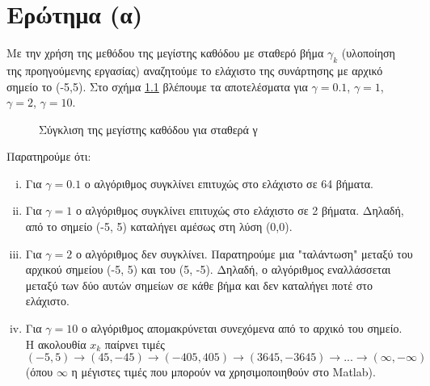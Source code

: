 \chapter{Ερώτημα (α)}

Με την χρήση της μεθόδου της μεγίστης καθόδου με σταθερό βήμα $\gamma_k$ (υλοποίηση της προηγούμενης εργασίας) 
αναζητούμε το ελάχιστο της συνάρτησης με αρχικό σημείο το (-5,5).
Στο σχήμα \ref{fig:stepeest_plots} βλέπουμε τα αποτελέσματα για $\gamma = 0.1$, $\gamma = 1$, $\gamma = 2$, $\gamma = 10$.

\begin{figure}[hbtp]
	\centering
	\setlength\figureheight{\textwidth}
	\setlength\figurewidth{\textwidth}
%	
	\caption{Σύγκλιση της μεγίστης καθόδου για σταθερά γ}
	\label{fig:stepeest_plots}
\end{figure}

\noindent \begin{minipage}{\linewidth}
\noindent Παρατηρούμε ότι:
\begin{enumerate}[i)]
	\item Για $\gamma = 0.1$ ο αλγόριθμος συγκλίνει επιτυχώς στο ελάχιστο σε 64 βήματα.
	\item Για $\gamma = 1$ ο αλγόριθμος συγκλίνει επιτυχώς στο ελάχιστο σε 2 βήματα. Δηλαδή, από το σημείο (-5, 5) καταλήγει αμέσως στη λύση (0,0).
	\item Για $\gamma = 2$ ο αλγόριθμος δεν συγκλίνει. Παρατηρούμε μια "ταλάντωση" μεταξύ του αρχικού σημείου (-5, 5) και του (5, -5). Δηλαδή, ο αλγόριθμος εναλλάσσεται μεταξύ των δύο αυτών σημείων σε κάθε βήμα και δεν καταλήγει ποτέ στο ελάχιστο.
	\item Για $\gamma = 10$ ο αλγόριθμος απομακρύνεται συνεχόμενα από το αρχικό του σημείο. Η ακολουθία $x_k$ παίρνει τιμές $(-5, 5) \rightarrow (45, -45) \rightarrow (-405, 405) \rightarrow (3645, -3645) \rightarrow ... \rightarrow (\infty, -\infty)$ (όπου $\infty$ η μέγιστες τιμές που μπορούν να χρησιμοποιηθούν στο Matlab).
\end{enumerate}
\end{minipage}


